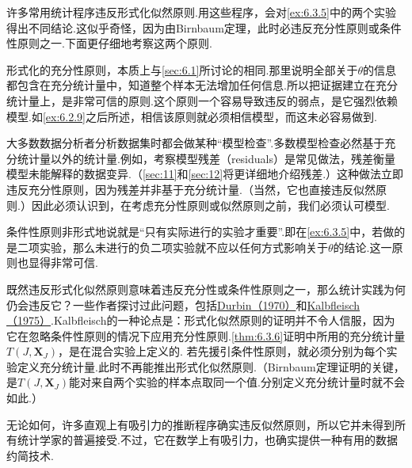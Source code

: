 许多常用统计程序违反形式化似然原则.用这些程序，会对\autoref{ex:6.3.5}中的两个实验得出不同结论.这似乎奇怪，因为由Birnbaum定理，此时必违反充分性原则或条件性原则之一.下面更仔细地考察这两个原则.

形式化的充分性原则，本质上与\autoref{sec:6.1}所讨论的相同.那里说明全部关于$\theta$的信息都包含在充分统计量中，知道整个样本无法增加任何信息.所以把证据建立在充分统计量上，是非常可信的原则.这个原则一个容易导致违反的弱点，是它强烈依赖模型.如\autoref{ex:6.2.9}之后所述，相信该原则就必须相信模型，而这未必容易做到.

大多数数据分析者分析数据集时都会做某种“模型检查”.多数模型检查必然基于充分统计量以外的统计量.例如，考察模型残差（residuals）是常见做法，残差衡量模型未能解释的数据变异.（\autoref{sec:11}和\autoref{sec:12}将更详细地介绍残差.）这种做法立即违反充分性原则，因为残差并非基于充分统计量.（当然，它也直接违反似然原则.）因此必须认识到，在考虑充分性原则或似然原则之前，我们必须认可模型.

条件性原则非形式地说就是“只有实际进行的实验才重要”.即在\autoref{ex:6.3.5}中，若做的是二项实验，那么未进行的负二项实验就不应以任何方式影响关于$\theta$的结论.这一原则也显得非常可信.

既然违反形式化似然原则意味着违反充分性或条件性原则之一，那么统计实践为何仍会违反它？一些作者探讨过此问题，包括\hyperref[bib:source103]{Durbin（1970）}和\mbox{\hyperref[bib:source185]{Kalbfleisch（1975）}.}\allowbreak{}Kalbfleisch的一种论点是：形式化似然原则的证明并不令人信服，因为它在忽略条件性原则的情况下应用充分性原则.\autoref{thm:6.3.6}证明中所用的充分统计量$T(J,\boldsymbol X_J)$，是在混合实验上定义的.
若先援引条件性原则，就必须分别为每个实验定义充分统计量.此时不再能推出形式化似然原则.（Birnbaum定理证明的关键，是$T(J,\boldsymbol X_J)$能对来自两个实验的样本点取同一个值.分别定义充分统计量时就不会如此.）

无论如何，许多直观上有吸引力的推断程序确实违反似然原则，所以它并未得到所有统计学家的普遍接受.不过，它在数学上有吸引力，也确实提供一种有用的数据约简技术.
